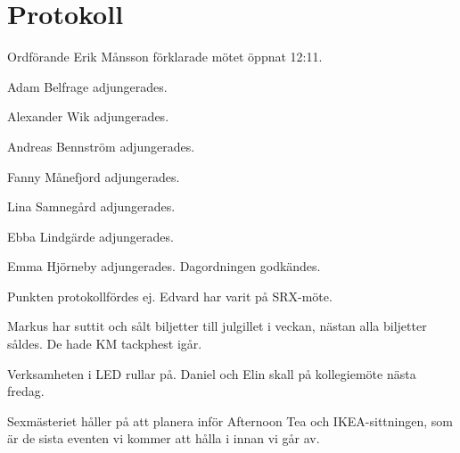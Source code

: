\documentclass[10pt]{article}
\def\mo{Erik Månsson}
\begin{document}
\section*{Protokoll}
\begin{paragrafer}
Ordförande {\mo} förklarade mötet öppnat 12:11.

{\valavmo}

{\valavms}

{\valavj}

{\tosg}

Adam Belfrage adjungerades.

Alexander Wik adjungerades.

Andreas Bennström adjungerades.

Fanny Månefjord adjungerades.

Lina Samnegård adjungerades.

Ebba Lindgärde adjungerades.

Emma Hjörneby adjungerades.
Dagordningen godkändes.



\begin{fyllnadsval} %
\end{fyllnadsval}

\begin{paragrafer}
Punkten protokollfördes ej.
Edvard har varit på SRX-möte.

Markus har suttit och sålt biljetter till julgillet i veckan, nästan alla biljetter såldes. De hade KM tackphest igår.

Verksamheten i LED rullar på. Daniel och Elin skall på kollegiemöte nästa fredag.

Sexmästeriet håller på att planera inför Afternoon Tea och IKEA-sittningen, som är de sista eventen vi kommer att hålla i innan vi går av.


\end{paragrafer}
\end{paragrafer}
\end{document}
